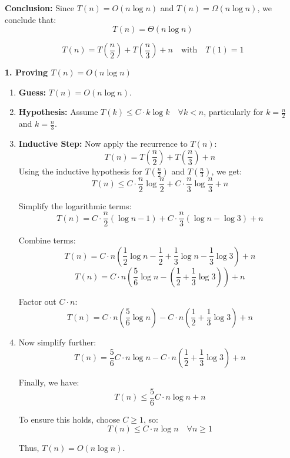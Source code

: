 \begin{example}
        \textbf{Conclusion:}
        Since \( T(n) = O(n \log n) \) and \( T(n) = \Omega(n \log n) \), we conclude that:
        \[
        T(n) = \Theta(n \log n)
        \]
    \end{example}

    \begin{example}
        \[ T(n) = T\left( \frac{n}{2} \right) + T\left( \frac{n}{3} \right) + n \quad \text{with} \quad T(1) = 1 \]

        \textbf{1. Proving \( T(n) = O(n \log n) \)}

        \begin{enumerate}[label=\arabic*)]
            \item \textbf{Guess:} \( T(n) = O(n \log n) \).
            
            \item \textbf{Hypothesis:} Assume \( T(k) \leq C \cdot k \log k \quad \forall k < n \), particularly for \( k = \frac{n}{2} \) and \( k = \frac{n}{3} \).
            
            \item \textbf{Inductive Step:} Now apply the recurrence to \( T(n) \):
            \[
            T(n) = T\left( \frac{n}{2} \right) + T\left( \frac{n}{3} \right) + n
            \]
            Using the inductive hypothesis for \( T\left( \frac{n}{2} \right) \) and \( T\left( \frac{n}{3} \right) \), we get:
            \[
            T(n) \leq C \cdot \frac{n}{2} \log \frac{n}{2} + C \cdot \frac{n}{3} \log \frac{n}{3} + n
            \]
            
            Simplify the logarithmic terms:
            \[
            T(n) = C \cdot \frac{n}{2} (\log n - 1) + C \cdot \frac{n}{3} (\log n - \log 3) + n
            \]
            
            Combine terms:
            \[
            T(n) = C \cdot n \left( \frac{1}{2} \log n - \frac{1}{2} + \frac{1}{3} \log n - \frac{1}{3} \log 3 \right) + n
            \]
            \[
            T(n) = C \cdot n \left( \frac{5}{6} \log n - \left( \frac{1}{2} + \frac{1}{3} \log 3 \right) \right) + n
            \]
            
            Factor out \( C \cdot n \):
            \[
            T(n) = C \cdot n \left( \frac{5}{6} \log n \right) - C \cdot n \left( \frac{1}{2} + \frac{1}{3} \log 3 \right) + n
            \]
            
            \item Now simplify further:
            \[
            T(n) = \frac{5}{6} C \cdot n \log n - C \cdot n \left( \frac{1}{2} + \frac{1}{3} \log 3 \right) + n
            \]
            
            Finally, we have:
            \[
            T(n) \leq \frac{5}{6} C \cdot n \log n + n
            \]
            
            To ensure this holds, choose \( C \geq 1 \), so:
            \[
            T(n) \leq C \cdot n \log n \quad \forall n \geq 1
            \]
            
            Thus, \( T(n) = O(n \log n) \).

        \end{enumerate}
    \end{example}


